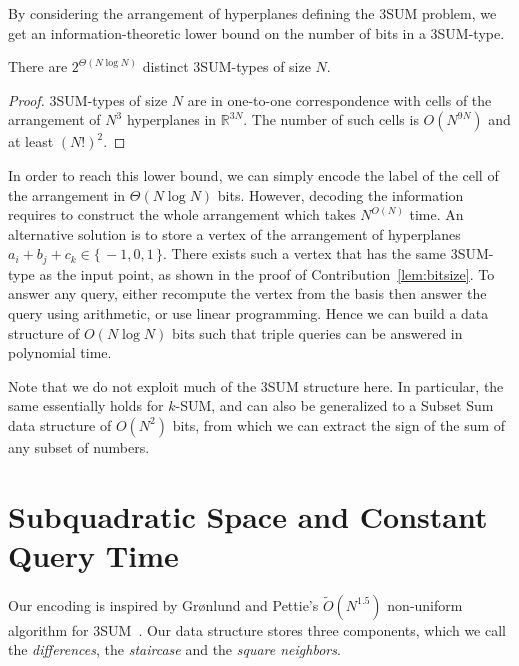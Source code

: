 By considering the arrangement of hyperplanes defining the 3SUM problem, we get an
information-theoretic lower bound on the number of bits in a 3SUM-type.

\begin{lemma}
  There are $2^{\Theta(N\log N)}$ distinct 3SUM-types of size $N$.
\end{lemma}
\begin{proof}
  3SUM-types of size $N$ are in one-to-one correspondence with cells of the
  arrangement of $N^3$ hyperplanes in $\mathbb{R}^{3N}$. The
  number of such cells is $O(N^{9N})$ and at least ${(N!)}^2$.
\end{proof}

In order to reach this lower bound, we can simply
encode the label of the cell of the arrangement in \(\Theta(N \log N)\) bits.
However, decoding the information
requires to construct the whole arrangement which takes \(N^{O(N)}\) time.
An alternative solution is to store a
vertex of the arrangement of hyperplanes \(a_i + b_j + c_k \in \{\,
-1, 0, 1\,\}\).
There exists such a vertex that has the same 3SUM-type as the input point, as
shown in the proof of Contribution~\ref{lem:bitsize}.
To answer any query, either recompute the vertex from the basis then answer the query using arithmetic,
or use linear programming.
Hence we can build a data structure of $O(N\log N)$ bits such that triple queries can be answered in polynomial time.

Note that we do not exploit much of the 3SUM structure here. In particular, the
same essentially holds for $k$-SUM, and can also be generalized to a {\sc
Subset Sum} data structure of $O(N^2)$ bits, from which we can extract the sign
of the sum of any subset of numbers.

\section{Subquadratic Space and Constant Query Time}\label{s:sscqt}
Our encoding is inspired by  Gr{\o}nlund and Pettie's $\tilde{O}(N^{1.5})$
non-uniform algorithm for 3SUM~\cite{GP18}.
Our data structure stores three components, which we call the
\emph{differences}, the \emph{staircase} and the \emph{square neighbors}.

